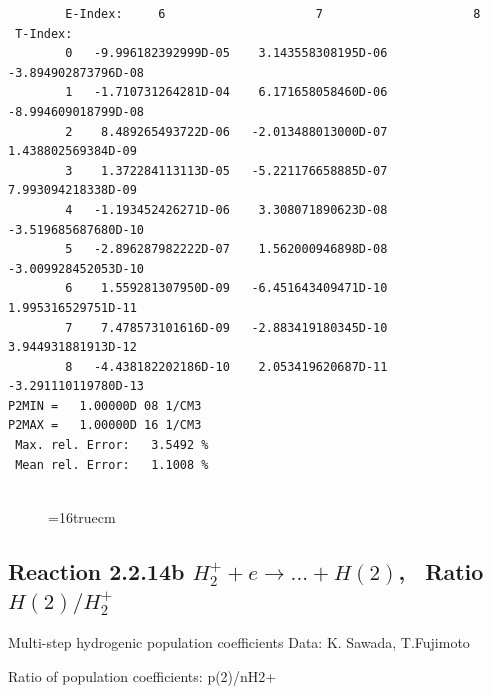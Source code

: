 \documentclass[12pt,dvipdfmx]{article}
\begin{document}
\begin{small}
\begin{verbatim}
        E-Index:     6                     7                     8
 T-Index:
        0   -9.996182392999D-05    3.143558308195D-06   -3.894902873796D-08
        1   -1.710731264281D-04    6.171658058460D-06   -8.994609018799D-08
        2    8.489265493722D-06   -2.013488013000D-07    1.438802569384D-09
        3    1.372284113113D-05   -5.221176658885D-07    7.993094218338D-09
        4   -1.193452426271D-06    3.308071890623D-08   -3.519685687680D-10
        5   -2.896287982222D-07    1.562000946898D-08   -3.009928452053D-10
        6    1.559281307950D-09   -6.451643409471D-10    1.995316529751D-11
        7    7.478573101616D-09   -2.883419180345D-10    3.944931881913D-12
        8   -4.438182202186D-10    2.053419620687D-11   -3.291110119780D-13
P2MIN =   1.00000D 08 1/CM3
P2MAX =   1.00000D 16 1/CM3
 Max. rel. Error:   3.5492 %
 Mean rel. Error:   1.1008 %


\end{verbatim}\end{small}
\begin{figure} \label{2.2.14a}
\epsfxsize=16truecm
\end{figure}
\newpage

\subsection{
Reaction 2.2.14b $ H_2^+ + e \rightarrow ...+ H(2) $, \  Ratio $H(2)/H_2^+  $
}

 Multi-step hydrogenic population coefficients
 Data: K. Sawada, T.Fujimoto \cite{kn:Sawada}

 Ratio of population coefficients: p(2)/nH2+
\end{document}
